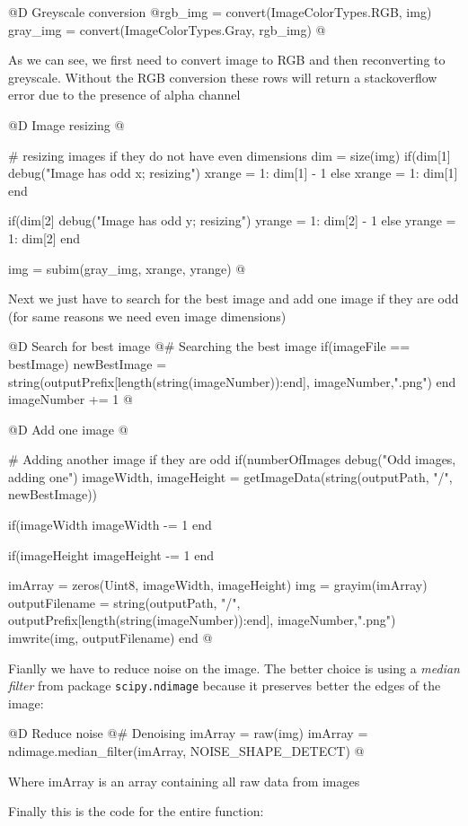 \documentclass[11pt,oneside]{article}	%
\begin{document}
@D Greyscale conversion
@{rgb_img = convert(Image{ColorTypes.RGB}, img)
gray_img = convert(Image{ColorTypes.Gray}, rgb_img) @}
    
As we can see, we first need to convert image to RGB and then reconverting to greyscale. Without the RGB conversion these rows will return a stackoverflow error due to the presence of alpha channel


@D Image resizing
@{# resizing images if they do not have even dimensions
dim = size(img)
if(dim[1] %
  debug("Image has odd x; resizing")
  xrange = 1: dim[1] - 1
else
  xrange = 1: dim[1]
end

if(dim[2] %
  debug("Image has odd y; resizing")
  yrange = 1: dim[2] - 1
else
  yrange = 1: dim[2]
end

img = subim(gray_img, xrange, yrange) @}
    

Next we just have to search for the best image and add one image if they are odd (for same reasons we need even image dimensions)

@D Search for best image
@{# Searching the best image
if(imageFile == bestImage)
  newBestImage = string(outputPrefix[length(string(imageNumber)):end],
			    imageNumber,".png")
end
imageNumber += 1 @}
    
@D Add one image
@{# Adding another image if they are odd
if(numberOfImages %
  debug("Odd images, adding one")  
  imageWidth, imageHeight = getImageData(string(outputPath, "/", newBestImage))
  
  if(imageWidth %
    imageWidth -= 1
  end
  
  if(imageHeight %
    imageHeight -= 1
  end  
  
  imArray = zeros(Uint8, imageWidth, imageHeight)
  img = grayim(imArray)
  outputFilename = string(outputPath, "/", 
		      outputPrefix[length(string(imageNumber)):end], imageNumber,".png")
  imwrite(img, outputFilename)
end @}


Fianlly we have to reduce noise on the image. The better choice is using a \textit{median filter} from package \texttt{scipy.ndimage} because it preserves better the edges of the image:

@D Reduce noise
@{# Denoising
imArray = raw(img)
imArray = ndimage.median_filter(imArray, NOISE_SHAPE_DETECT) @}

Where imArray is an array containing all raw data from images

Finally this is the code for the entire function:
\end{document}
